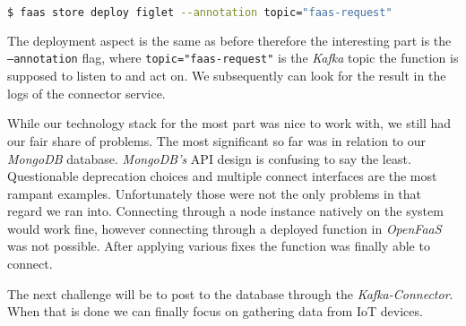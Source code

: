 \begin{lstlisting}[language=bash]
  $ faas store deploy figlet --annotation topic="faas-request"
\end{lstlisting}

The deployment aspect is the same as before therefore the interesting part is the
\texttt{--annotation} flag, where \texttt{topic="faas-request"} is the \textit{Kafka} topic the
function is supposed to listen to and act on. We subsequently can look for the result in the logs of
the connector service.

While our technology stack for the most part was nice to work with, we still had our fair share of
problems. The most significant so far was in relation to our \textit{MongoDB} database.
\textit{MongoDB's} API design is confusing to say the least. Questionable deprecation choices and
multiple connect interfaces are the most rampant examples. Unfortunately those were not the only
problems in that regard we ran into. Connecting through a node instance natively on the system would
work fine, however connecting through a deployed function in \textit{OpenFaaS} was not possible.
After applying various fixes the function was finally able to connect.

The next challenge will be to post to the database through the \textit{Kafka-Connector}. When that
is done we can finally focus on gathering data from IoT devices.





